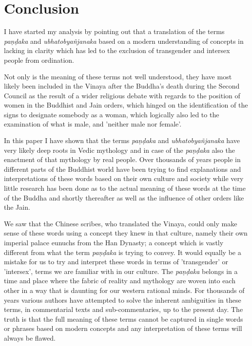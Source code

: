 \section{Conclusion}
I have started my analysis by pointing out that a translation of the terms {\em paṇḍaka} and {\em ubhatob­yañ­janaka} based on a modern understanding of concepts in lacking in clarity which has led to the exclusion of transgender and intersex people from ordination.

Not only is the meaning of these terms not well understood, they have most likely been included in the Vinaya after the Buddha's death during the Second Council as the result of a wider religious debate with regards to the position of women in the Buddhist and Jain orders, which hinged on the identification of the signs to designate somebody as a woman, which logically also led to the examination of what is male, and 'neither male nor female'.

In this paper I have shown that the terms {\em paṇḍaka} and {\em ubhatob­yañ­janaka} have very likely deep roots in Vedic mythology and in case of the {\em paṇḍaka} also the enactment of that mythology by real people. Over thousands of years people in different parts of the Buddhist world have been trying to find explanations and interpretations of these words based on their own culture and society while very little research has been done as to the actual meaning of these words at the time of the Buddha and shortly thereafter as well as the influence of other orders like the Jain. 

We saw that the Chinese scribes, who translated the Vinaya, could only make sense of these words using a concept they knew in that culture, namely their own imperial palace eunuchs from the Han Dynasty; a concept which is vastly different from what the term {\em paṇḍaka} is trying to convey. It would equally be a mistake for us to try and interpret these words in terms of 'transgender' or 'intersex', terms we are familiar with in our culture. The {\em paṇḍaka} belongs in a time and place where the fabric of reality and mythology are woven into each other in a way that is daunting for our western rational minds. For thousands of years various authors have attempted to solve the inherent ambiguities in these terms, in commentarial texts and sub-commentaries, up to the present day. The truth is that the full meaning of these terms cannot be captured in single words or phrases based on modern concepts and any interpretation of these terms will always be flawed.

